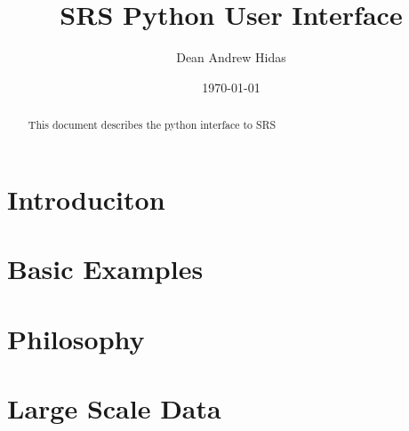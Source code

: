 \documentclass{article}
\title{SRS Python User Interface}
\author{Dean Andrew Hidas}
\date{\today}
\begin{document}
\maketitle

\begin{abstract}
This document describes the python interface to SRS
\end{abstract}

\section{Introduciton}



\section{Basic Examples}


\section{Philosophy}


\section{Large Scale Data}
\end{document}
